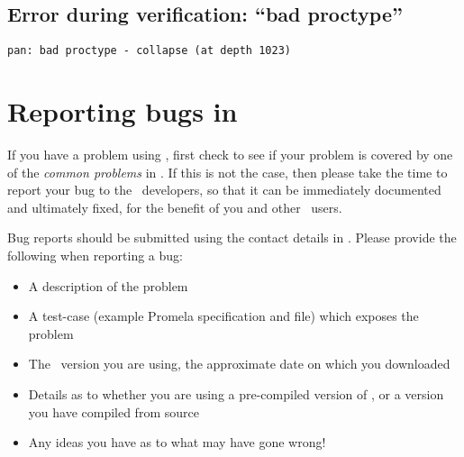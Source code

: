 
\subsection{Error during verification: ``bad proctype''}\label{sec:troubleshooting:common:termination}


\exampleerrormessage

\begin{lstlisting}
pan: bad proctype - collapse (at depth 1023)
\end{lstlisting}





%
%
%
%

%
\section{Reporting bugs in \protect\topspin}\label{sec:troubleshooting:reportingbugs}
%
If you have a problem using \topspin, first check to see if your
problem is covered by one of the \emph{common problems} in
.  If this is not the case, then
please take the time to report your bug to the \topspin\ developers,
so that it can be immediately documented and ultimately fixed, for
the benefit of you and other \topspin\ users.

Bug reports should be submitted using the contact details in
.  Please provide the
following when reporting a bug:

\begin{itemize}
\item A description of the problem
\item A test-case (example Promela specification and  file) which exposes the problem
\item The \topspin\ version you are using, the approximate date on which you downloaded \topspin
\item Details as to whether you are using a pre-compiled version of \topspin, or a version you have compiled from source
\item Any ideas you have as to what may have gone wrong!
\end{itemize}


